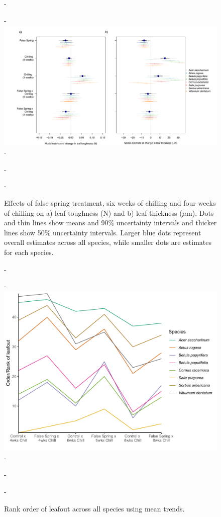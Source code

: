 \documentclass{article}\usepackage[]{graphicx}\usepackage[]{color}
\begin{document}
  {\begin{figure} [H]
  -\begin{center}
  -\includegraphics[width=18cm]{..//analyses/figures/mu_leaftraits.pdf} 
  -\caption{Effects of false spring treatment, six weeks of chilling and four weeks of chilling on a) leaf toughness (N) and b) leaf thickness ($\mu$m). Dots and thin lines show means and 90\% uncertainty intervals and thicker lines show 50\% uncertainty intervals. Larger blue dots represent overall estimates across all species, while smaller dots are estimates for each species. }\label{fig:muleaf}
  -\end{center}
  -\end{figure}}
  
  {\begin{figure} [H]
  -\begin{center}
  -\includegraphics[width=12cm]{..//analyses/figures/leafoutorder_byrank.pdf} 
  -\caption{Rank order of leafout across all species using mean trends. }\label{fig:rank}
  -\end{center}
  -\end{figure}}
  
\end{document}
